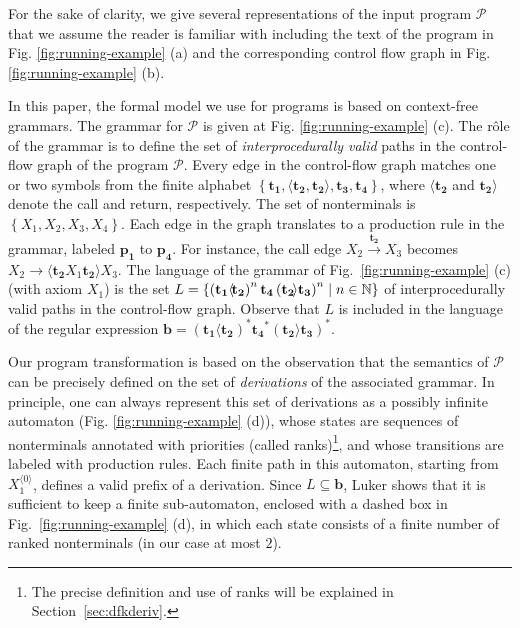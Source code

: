 \documentclass[final]{llncs}
\newcommand{\arrow}[2]{\xrightarrow{{\scriptscriptstyle #1}}}
\newcommand{\nat}{{\bf \mathbb{N}}}
\def\set#1{{\left\{ #1 \right\}}}
\def\tuple#1{{\langle #1 \rangle}}
\def\pat{{\mathbf{b}}}
\begin{document}
For the sake of clarity, we give several representations of the input program
\(\mathcal{P}\) that we assume the reader is familiar with including the text of the
program in Fig.  \ref{fig:running-example} (a) and the corresponding control flow
graph in Fig.  \ref{fig:running-example} (b).


In this paper, the formal model we use for programs is based on context-free grammars.
The grammar for \(\mathcal{P}\) is given at  Fig. \ref{fig:running-example} (c).
The r\^ole of the grammar is to define the set
of \emph{interprocedurally valid} paths in the control-flow graph of
the program \(\mathcal{P}\). Every edge in the control-flow graph matches one or two
symbols from the finite alphabet
$\set{\mathbf{t_1}, \langle\!\mathbf{t_2},
\mathbf{t_2}\!\rangle, \mathbf{t_3}, \mathbf{t_4}}$,
where $\langle\!\mathbf{t_2}$ and $\mathbf{t_2}\!\rangle$ denote the
call and return, respectively. The set of nonterminals is
$\set{X_1,X_2,X_3,X_4}$. Each edge
in the graph translates to a production rule in the grammar, labeled
$\mathbf{p_1}$ to $\mathbf{p_4}$.  For instance, the call edge
$X_2 \arrow{\mathbf{t_2}}{} X_3$ becomes
$X_2 \rightarrow \langle\!\mathbf{t_2} X_1 \mathbf{t_2}\!\rangle
X_3$. The language of the grammar of Fig.~\ref{fig:running-example} (c) (with axiom $X_1$) is
the set $L=\set{\left(\mathbf{t_1}\langle\!\mathbf{t_2}\right)^n \mathbf{t_4}
\left(\mathbf{t_2}\!\rangle\mathbf{t_3}\right)^n \mid n \in \nat}$ of 
interprocedurally valid paths in the control-flow graph. Observe that
\(L\) is included in the language of the regular expression \(\pat
= \left(\mathbf{t_1}\langle\!\mathbf{t_2}\right)^* \mathbf{t_4}^*
\left(\mathbf{t_2}\!\rangle\mathbf{t_3}\right)^*\).

Our program transformation is based on the observation that the semantics of
\(\mathcal{P}\) can be precisely defined on the set of \emph{derivations} of
the associated grammar. In principle, one can always represent this set of
derivations as a possibly infinite automaton (Fig. \ref{fig:running-example}
(d)), whose states are sequences of nonterminals annotated with priorities
(called ranks)\footnote{The precise definition and use of ranks will be
explained in Section~\ref{sec:dfkderiv}.}, and whose transitions are labeled
with production rules. Each finite path in this automaton, starting from
$X_1^\tuple{0}$, defines a valid prefix of a derivation. Since \(L\subseteq
\pat\), Luker \cite{Luker78} shows that it is sufficient to keep a finite
sub-automaton, enclosed with a dashed box in Fig.~\ref{fig:running-example} (d),
in which each state consists of a finite number of ranked nonterminals (in our
case at most \(2\)).
\end{document}
